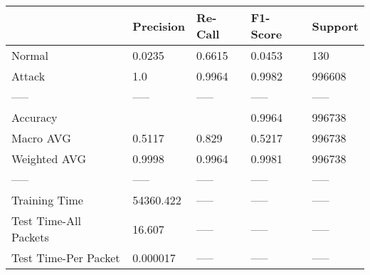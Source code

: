 \begin{tabular}{lllll}
\toprule
{} &  Precision & Re-Call & F1-Score & Support \\
\midrule
Normal                &     0.0235 &  0.6615 &   0.0453 &     130 \\
Attack                &        1.0 &  0.9964 &   0.9982 &  996608 \\
-----                 &      ----- &   ----- &    ----- &   ----- \\
Accuracy              &            &         &   0.9964 &  996738 \\
Macro AVG             &     0.5117 &   0.829 &   0.5217 &  996738 \\
Weighted AVG          &     0.9998 &  0.9964 &   0.9981 &  996738 \\
-----                 &      ----- &   ----- &    ----- &   ----- \\
Training Time         &  54360.422 &   ----- &    ----- &   ----- \\
Test Time-All Packets &     16.607 &   ----- &    ----- &   ----- \\
Test Time-Per Packet  &   0.000017 &   ----- &    ----- &   ----- \\
\bottomrule
\end{tabular}

